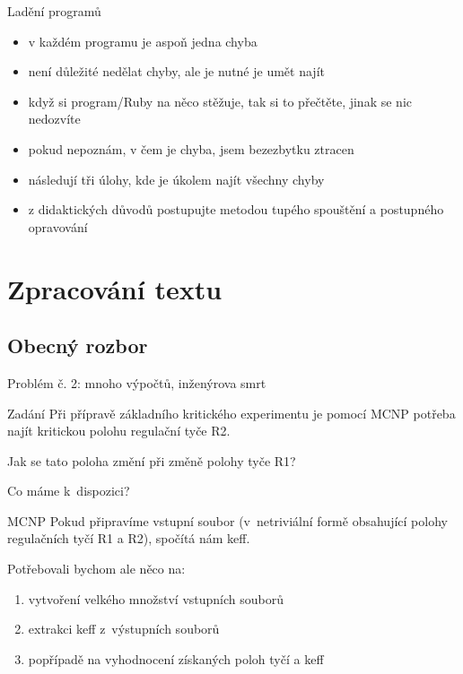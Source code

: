 \documentclass{beamer}
\begin{document}
\begin{frame}{Ladění programů}
  \begin{itemize}
    \item v každém programu je aspoň jedna chyba
    \item není důležité nedělat chyby, ale je nutné je umět najít
    \item když si program/Ruby na něco stěžuje, tak si to přečtěte, jinak se nic nedozvíte
    \item pokud nepoznám, v čem je chyba, jsem bezezbytku ztracen
    \item následují tři úlohy, kde je úkolem najít všechny chyby
    \item z didaktických důvodů postupujte metodou tupého spouštění a postupného opravování
  \end{itemize}
\end{frame}

\section{Zpracování textu}

\subsection{Obecný rozbor}

\begin{frame}{Problém č. 2: mnoho výpočtů, inženýrova smrt}
  \begin{block}{Zadání}
    Při přípravě základního kritického experimentu je pomocí MCNP potřeba najít kritickou polohu regulační tyče R2.

    Jak se tato poloha změní při změně polohy tyče R1?
  \end{block}
\end{frame}

\begin{frame}{Co máme k~dispozici?}
  \begin{block}{MCNP}
    Pokud připravíme vstupní soubor (v~netriviální formě obsahující polohy regulačních tyčí R1 a R2), spočítá nám keff.
  \end{block}
  Potřebovali bychom ale něco na:
  \begin{enumerate}
    \item vytvoření velkého množství vstupních souborů
    \item extrakci keff z~výstupních souborů
    \item popřípadě na vyhodnocení získaných poloh tyčí a keff
  \end{enumerate}
\end{frame}
\end{document}
